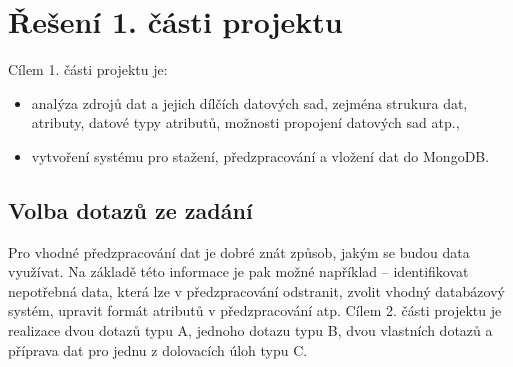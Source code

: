 \documentclass[12pt]{article}
\begin{document}
\afterpage{\cfoot{\thepage }}

\section{Řešení 1. části projektu}
Cílem 1. části projektu je:
\begin{itemize}
    \item analýza zdrojů dat a jejich dílčích datových sad, zejména strukura dat, atributy, datové typy atributů, možnosti propojení datových sad atp.,
    \item vytvoření systému pro stažení, předzpracování a vložení dat do MongoDB.
\end{itemize}

\subsection{Volba dotazů ze zadání}
\label{dotazy}
Pro vhodné předzpracování dat je dobré znát způsob, jakým se budou data využívat. Na základě této informace je pak možné například -- identifikovat nepotřebná data, která lze v předzpracování odstranit, zvolit vhodný databázový systém, upravit formát atributů v předzpracování atp. Cílem 2. části projektu je realizace dvou dotazů typu A, jednoho dotazu typu B, dvou vlastních dotazů a příprava dat pro jednu z dolovacích úloh typu C.
\end{document}
